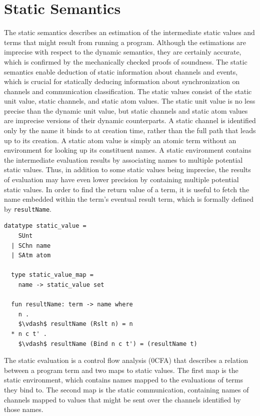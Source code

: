\documentclass[letterpaper, 11pt]{report}
\begin{document}
\section{Static Semantics}

The static semantics describes an estimation of the intermediate static values and terms
that might result from running a program. Although the estimations are imprecise with
respect to the dynamic semantics, they are certainly accurate,
which is confirmed by the mechanically checked proofs of soundness.
The static semantics enable deduction of static information about channels and events, which is
crucial for statically deducing information about synchronization on channels and
communication classification.
The static values consist of the static unit value, static channels, and static atom
values. The static unit value is no less precise than the dynamic unit value, but
static channels and static atom values are imprecise versions of their dynamic
counterparts. A static channel is identified only by the name it binds to at creation time,
rather than the full path that leads up to its creation. A static atom value is simply an
atomic term without an environment for looking up its constituent names. A static
environment contains the intermediate evaluation results by
associating names to multiple potential static values.
Thus, in addition to some static values being imprecise,
the results of evaluation may have even lower precision
by containing multiple potential static values. 
In order to find the return value of a term, it is useful to fetch the name
embedded within the term's eventual result term, which is formally defined by \lstinline{resultName}.

\begin{lstlisting}[language=logic, mathescape]
  datatype static_value =
    SUnt
  | SChn name
  | SAtm atom 

  type static_value_map =
    name -> static_value set

  fun resultName: term -> name where
    n .
    $\vdash$ resultName (Rslt n) = n
  * n c t' . 
    $\vdash$ resultName (Bind n c t') = (resultName t)
\end{lstlisting}

The static evaluation is a control flow analysis (0CFA)
that describes a relation between a program term and two maps to static values.
The first map is the static environment, which contains names mapped to the 
evaluations of terms they bind to.
The second map is the static communication, containing names of channels mapped to
values that might be sent over the channels identified by those names.
\end{document}
